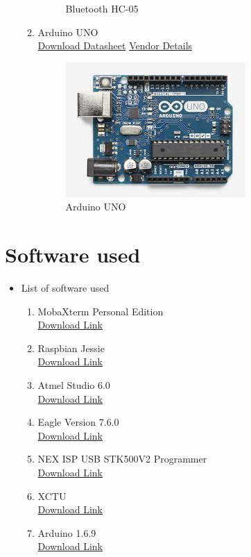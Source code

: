 \documentclass[a4paper,12pt,oneside]{book}
\begin{document}
\begin{itemize}
\begin{enumerate}
\begin{figure}[H]
        \caption{Bluetooth HC-05}
      \end{figure}
      \item Arduino UNO   \\
      \href{www.mouser.com/pdfdocs/Gravitech_ATMEGA328_datasheet.pdf} {Download Datasheet}
      \href{http://www.amazon.in/Arduino-UNO-board-DIP-ATmega328P/dp/B008GRTSV6} {Vendor Details}
      \begin{figure}[H]
        \centering
        \includegraphics[scale=0.6]{uno}
        \caption{Arduino UNO}
      \end{figure}
  \end{enumerate}
\end{itemize}

\section{Software used}
\begin{itemize}
  \item List of software used 
  \begin{enumerate}
      \item MobaXterm Personal Edition \\
      \href{http://mobaxterm.mobatek.net/MobaXterm_Setup_9.1.msi} {Download Link}
      \item Raspbian Jessie   \\
      \href{https://downloads.raspberrypi.org/raspbian_latest}{Download Link}
      \item Atmel Studio 6.0 \\
      \href{http://atmel-studio.software.informer.com/download/?ca56297}{Download Link}
      \item Eagle Version 7.6.0 \\
      \href{http://www.cadsoftusa.com/download-eagle/}{Download Link}
      \item NEX ISP USB STK500V2 Programmer \\
      \href{http://www.nex-robotics.com/images/downloads/NEX\%20AVR\%20STK500V2.zip}{Download Link}
      \item XCTU \\
      \href{http://www.digi.com/products/xbee-rf-solutions/xctu-software/xctu#productsupport-utilities}{Download Link}
      \item Arduino 1.6.9  \\
       \href{https://www.arduino.cc/en/Main/Software}{Download Link}
      
      
  \end{enumerate}
\end{itemize}
\end{document}
